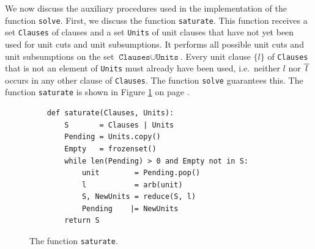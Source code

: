 We now discuss the auxiliary procedures used in the implementation of the function
\texttt{solve}.
First, we discuss the function \texttt{saturate}. This function receives a
set \texttt{Clauses} of clauses and a set \texttt{Units} of unit clauses that have not yet been used for unit
cuts and unit subsumptions.  It performs all possible unit cuts and unit subsumptions on the set
$\texttt{Clauses} \cup \texttt{Units}$.  Every unit clause $\{l\}$ of \texttt{Clauses} that is not an element of
\texttt{Units} must already have been used, i.e.~neither $l$ nor $\overline{\,l\,}$ occurs in any other clause of
\texttt{Clauses}.  The function \texttt{solve} guarantees this.
The function \texttt{saturate} is shown in Figure \ref{fig:saturate} on page \pageref{fig:saturate}.

\begin{figure}[!ht]
  \centering
\begin{verbatim}
    def saturate(Clauses, Units):
        S       = Clauses | Units
        Pending = Units.copy()
        Empty   = frozenset()
        while len(Pending) > 0 and Empty not in S:
            unit        = Pending.pop()
            l           = arb(unit)
            S, NewUnits = reduce(S, l)
            Pending    |= NewUnits
        return S
\end{verbatim}
\vspace*{-0.3cm}
  \caption{The function \texttt{saturate}. }
  \label{fig:saturate}
\end{figure}
